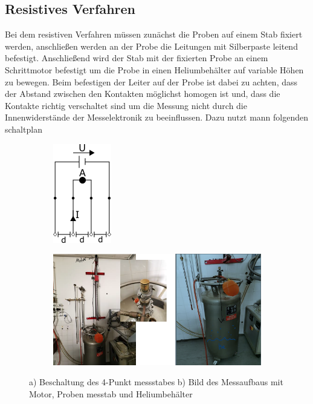     \subsection*{Resistives Verfahren}
    Bei dem resistiven Verfahren müssen zunächst die Proben auf einem Stab fixiert werden, anschließen werden
    an der Probe die Leitungen mit Silberpaste leitend befestigt. Anschließend wird der Stab mit der fixierten
    Probe an einem Schrittmotor befestigt um die Probe in einen Heliumbehälter auf variable Höhen zu bewegen.
    Beim befestigen der Leiter auf der Probe ist dabei zu achten, dass der Abstand zwischen den Kontakten möglichst
    homogen ist und, dass die Kontakte richtig verschaltet sind um die Messung nicht durch die Innenwiderstände
    der Messelektronik zu beeinflussen. Dazu nutzt mann folgenden schaltplan
    \begin{figure}[H]
        \centering
        \begin{subfigure}{.5\textwidth}
        \centering
        \includegraphics[width=.4\linewidth]{images/schaltplan.png}
        \caption{}
        \label{fig:sub11}
        \end{subfigure}%
        \begin{subfigure}{.5\textwidth}
        \centering
        \includegraphics[width=.8\linewidth]{images/aufbaures.png}
        \caption{}
        \label{fig:sub22}
        \end{subfigure} 
        \caption{a) Beschaltung des 4-Punkt messstabes b) Bild des Messaufbaus mit Motor, Proben messtab und Heliumbehälter}
        \label{fig:test1}
    \end{figure}

